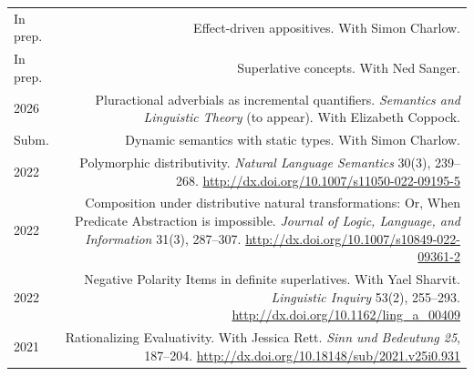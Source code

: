 \documentclass[12pt]{article}
\renewcommand{\arraystretch}{1.25} %
\newcommand{\doi}[1]{\url{http://dx.doi.org/#1}}
\newcommand{\flag}{}
\begin{document}
\begingroup
\renewcommand{\arraystretch}{1.5} %
\begin{longtable}{LR}
  In prep. & Effect-driven appositives.\newline
         With Simon Charlow.\\
  In prep. & Superlative concepts.\newline
          With Ned Sanger.\\
  2026  & Pluractional adverbials as incremental quantifiers.\newline
          \textit{Semantics and Linguistic Theory} (to appear).\newline
          With Elizabeth Coppock.\\
  \flag%
  Subm. & Dynamic semantics with static types.\newline
          With Simon Charlow.\\
  \flag%
  2022  & Polymorphic distributivity.\newline
          \textit{Natural Language Semantics} 30(3), 239--268.\newline
          \doi{10.1007/s11050-022-09195-5}\\
  \flag%
  2022  & Composition under distributive natural transformations: Or, When
          Predicate Abstraction is impossible.\newline
          \textit{Journal of Logic, Language, and Information} 31(3), 287--307.\newline
          \doi{10.1007/s10849-022-09361-2}\\
  \flag%
  2022  & Negative Polarity Items in definite superlatives.\newline
          With Yael Sharvit.\newline
          \textit{Linguistic Inquiry} 53(2), 255--293.\newline
          \doi{10.1162/ling_a_00409}\\
  2021  & Rationalizing Evaluativity.\newline
          With Jessica Rett.\newline
          \textit{Sinn und Bedeutung 25}, 187--204.\newline
          \doi{10.18148/sub/2021.v25i0.931}\\

\end{longtable}
\end{document}
